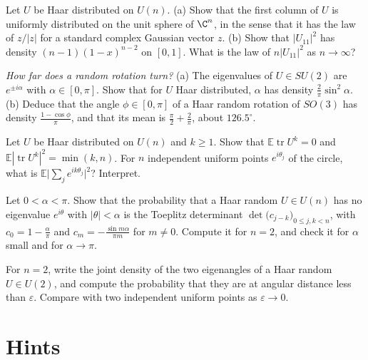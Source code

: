 \begin{exercise}[$\star\star$]\label{ex:firstcolumn}
Let $U$ be Haar distributed on $U(n)$. (a) Show that the first column of $U$ is uniformly distributed on the unit sphere of $\C^n$, in the sense that it has the law of $z/|z|$ for a standard
complex Gaussian vector $z$. (b) Show that $|U_{11}|^2$ has density $(n-1)(1-x)^{n-2}$ on $[0,1]$. What is the law of $n|U_{11}|^2$ as $n\to\infty$?
\end{exercise}

\begin{exercise}[$\star\star$]\label{ex:su2weyl}
\emph{How far does a random rotation turn?} (a) The eigenvalues of $U\in SU(2)$ are $e^{\pm i\alpha}$ with $\alpha\in[0,\pi]$. Show that for $U$ Haar distributed, $\alpha$ has density $\frac2\pi\sin^2\alpha$. (b) Deduce that
the angle $\phi\in[0,\pi]$ of a Haar random rotation of $SO(3)$ has density $\frac{1-\cos\phi}\pi$, and that its mean is $\frac\pi2+\frac2\pi$, about $126.5^\circ$.
\end{exercise}

\begin{exercise}[$\star\star$]\label{ex:tracemoments}
Let $U$ be Haar distributed on $U(n)$ and $k\ge1$. Show that $\mathbb E\operatorname{tr}U^k=0$ and $\mathbb E|\operatorname{tr}U^k|^2=\min(k,n)$. For $n$ independent uniform points $e^{i\theta_j}$ of the circle,
what is $\mathbb E\bigl|\sum_je^{ik\theta_j}\bigr|^2$? Interpret.
\end{exercise}

\begin{exercise}[$\star\star$]\label{ex:gap}
Let $0<\alpha<\pi$. Show that the probability that a Haar random $U\in U(n)$ has no eigenvalue $e^{i\theta}$ with $|\theta|<\alpha$ is the Toeplitz determinant $\det\bigl(c_{j-k}\bigr)_{0\le j,k<n}$, with
$c_0=1-\frac\alpha\pi$ and $c_m=-\frac{\sin m\alpha}{\pi m}$ for $m\neq0$. Compute it for $n=2$, and check it for $\alpha$ small and for $\alpha\to\pi$.
\end{exercise}

\begin{exercise}[$\star$]\label{ex:repulsion}
For $n=2$, write the joint density of the two eigenangles of a Haar random $U\in U(2)$, and compute the probability that they are at angular distance less than $\varepsilon$. Compare
with two independent uniform points as $\varepsilon\to0$.
\end{exercise}

\section{Hints}


